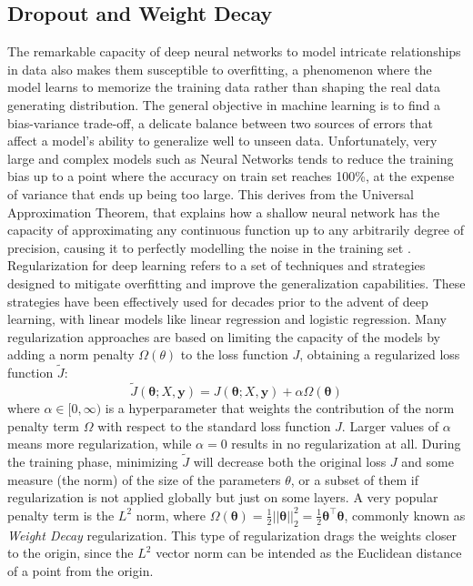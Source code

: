\documentclass[binding=0.7cm, oneside]{sapthesis}
\begin{document}
\subsection{Dropout and Weight Decay}
The remarkable capacity of deep neural networks to model intricate relationships in data also makes them susceptible to overfitting, a phenomenon where the model learns to memorize the training data rather than shaping the real data generating distribution. The general objective in machine learning is to find a bias-variance trade-off, a delicate balance between two sources of errors that affect a model's ability to generalize well to unseen data. Unfortunately,
very large and complex models such as Neural Networks tends to reduce the training bias up to a point where the accuracy on train set reaches 100\%, at the expense of variance that ends up being too large. This derives from the Universal Approximation Theorem, that explains how a shallow neural network has the capacity of approximating any continuous function up to any arbitrarily degree of precision, causing it to perfectly modelling the noise in the training set \cite{overfitting}.
Regularization for deep learning refers to a set of techniques and strategies designed to mitigate overfitting and improve the generalization capabilities. These strategies have been effectively used for decades prior to the advent of deep learning, with linear models like linear regression and logistic regression. Many regularization approaches are based on limiting the capacity of the models by adding a norm penalty $\Omega(\theta)$ to the loss function $J$, obtaining a regularized
loss function $\tilde{J}$:
$$\tilde{J}(\boldsymbol{\theta}; X, \boldsymbol{y}) = J(\boldsymbol{\theta}; X, \boldsymbol{y}) + \alpha\Omega(\boldsymbol{\theta})$$
where $\alpha \in [0, \infty)$ is a hyperparameter that weights the contribution of the norm penalty term $\Omega$ with respect to the standard loss function $J$. Larger values of $\alpha$ means more regularization, while $\alpha = 0$ results in no regularization at all.
During the training phase, minimizing $\tilde{J}$ will decrease both the original loss $J$ and some measure (the norm) of the size of the parameters $\theta$, or a subset of them if regularization is not applied globally but just on some layers.
A very popular penalty term is the $L^2$ norm, where $\Omega(\boldsymbol{\theta}) = \frac{1}{2}||\boldsymbol{\theta}||^{2}_{2} = \frac{1}{2}\boldsymbol{\theta}^\top\boldsymbol{\theta}$, commonly known as \emph{Weight Decay} regularization. This type of regularization drags the weights closer to the origin, since the $L^2$ vector norm can be intended as the Euclidean distance of a point from the origin.
\end{document}
